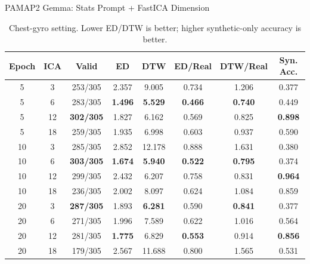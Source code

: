 \begin{frame}{PAMAP2 Gemma: Stats Prompt + FastICA Dimension}
\scriptsize
\setlength{\tabcolsep}{3.2pt}

\begin{table}
\centering
\caption{Chest-gyro setting. Lower ED/DTW is better; higher synthetic-only accuracy is better.}
\begin{tabular}{cccccccc}
\toprule
Epoch & ICA & Valid & ED & DTW & ED/Real & DTW/Real & Syn. Acc. \\
\midrule
5  & 3  & 253/305 & 2.357 & 9.005  & 0.734 & 1.206 & 0.377 \\
5  & 6  & 283/305 & \textbf{1.496} & \textbf{5.529} & \textbf{0.466} & \textbf{0.740} & 0.449 \\
5  & 12 & \textbf{302/305} & 1.827 & 6.162 & 0.569 & 0.825 & \textbf{0.898} \\
5  & 18 & 259/305 & 1.935 & 6.998 & 0.603 & 0.937 & 0.590 \\
\midrule
10 & 3  & 285/305 & 2.852 & 12.178 & 0.888 & 1.631 & 0.380 \\
10 & 6  & \textbf{303/305} & \textbf{1.674} & \textbf{5.940} & \textbf{0.522} & \textbf{0.795} & 0.374 \\
10 & 12 & 299/305 & 2.432 & 6.207 & 0.758 & 0.831 & \textbf{0.964} \\
10 & 18 & 236/305 & 2.002 & 8.097 & 0.624 & 1.084 & 0.859 \\
\midrule
20 & 3  & \textbf{287/305} & 1.893 & \textbf{6.281} & 0.590 & \textbf{0.841} & 0.377 \\
20 & 6  & 271/305 & 1.996 & 7.589 & 0.622 & 1.016 & 0.564 \\
20 & 12 & 281/305 & \textbf{1.775} & 6.829 & \textbf{0.553} & 0.914 & \textbf{0.856} \\
20 & 18 & 179/305 & 2.567 & 11.688 & 0.800 & 1.565 & 0.531 \\
\bottomrule
\end{tabular}
\end{table}


\end{frame}
